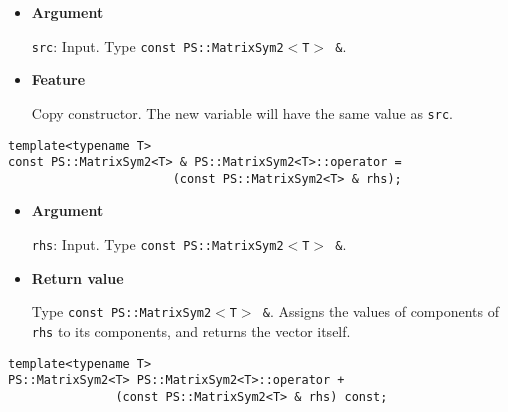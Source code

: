 \begin{itemize}

\item{{\bf Argument}}

\texttt{src}: Input. Type \texttt{const PS::MatrixSym2$<$T$>$ \&}.

\item{{\bf Feature}}

Copy constructor. The new variable will have the same value as \texttt{src}.

\end{itemize}


\begin{screen}
\begin{verbatim}
template<typename T>
const PS::MatrixSym2<T> & PS::MatrixSym2<T>::operator = 
                       (const PS::MatrixSym2<T> & rhs);
\end{verbatim}
\end{screen}

\begin{itemize}

\item{{\bf Argument}}

\texttt{rhs}: Input. Type \texttt{const PS::MatrixSym2$<$T$>$ \&}.

\item{{\bf Return value}}

Type \texttt{const PS::MatrixSym2$<$T$>$ \&}. Assigns the values of components of \texttt{rhs}
to its components, and returns the vector itself.

\end{itemize}


\begin{screen}
\begin{verbatim}
template<typename T>
PS::MatrixSym2<T> PS::MatrixSym2<T>::operator + 
               (const PS::MatrixSym2<T> & rhs) const;
\end{verbatim}
\end{screen}


